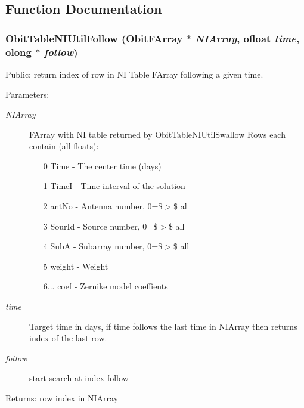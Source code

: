 \subsection{Function Documentation}
\subsubsection{ Obit\-Table\-NIUtil\-Follow ({\bf Obit\-FArray} $\ast$ {\em NIArray}, {\bf ofloat} {\em time}, {\bf olong} $\ast$ {\em follow})}\label{ObitTableNIUtil_8h_a2}


Public: return index of row in NI Table FArray following a given time. 

\begin{Desc}
\item[Parameters:]
\begin{description}
\item[{\em NIArray}]FArray with NI table returned by Obit\-Table\-NIUtil\-Swallow Rows each contain (all floats): \begin{itemize}
\item [0] Time - The center time (days) \item [1] Time\-I - Time interval of the solution \item [2] ant\-No - Antenna number, 0=\$$>$\$ al \item [3] Sour\-Id - Source number, 0=\$$>$\$ all \item [4] Sub\-A - Subarray number, 0=\$$>$\$ all \item [5] weight - Weight \item [6...] coef - Zernike model coeffients \end{itemize}
\item[{\em time}]Target time in days, if time follows the last time in NIArray then returns index of the last row. \item[{\em follow}]start search at index follow \end{description}
\end{Desc}
\begin{Desc}
\item[Returns:]row index in NIArray \end{Desc}
